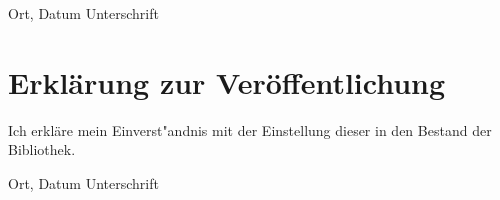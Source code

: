 \documentclass[12pt,final,twoside]{report}
\begin{document}
\vspace{4cm}
\noindent Ort, Datum \hfill Unterschrift

\newpage
\thispagestyle{empty}
\hspace{1cm}
\newpage

\vspace{2cm}
\chapter*{Erkl\"arung zur Ver\"offentlichung}
Ich erkl\"are mein Einverst"andnis mit der Einstellung dieser \trtype{} in den Bestand der Bibliothek.

\vspace{4cm}
\noindent Ort, Datum \hfill Unterschrift

\newpage
\thispagestyle{empty}
\hspace{1cm}
\newpage
\end{document}
